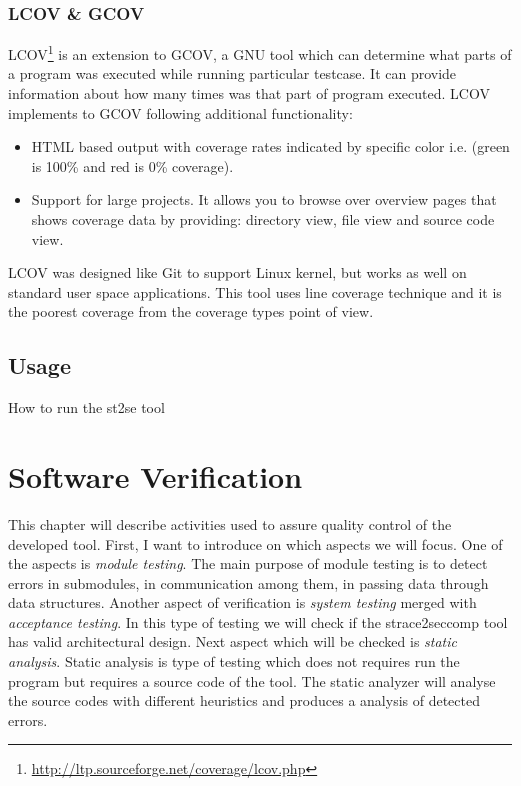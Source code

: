 \subsection{LCOV \& GCOV}
LCOV\footnote{\url{http://ltp.sourceforge.net/coverage/lcov.php}} is an extension to GCOV, a GNU tool which can determine what parts of a program was executed while running particular testcase.
It can provide information about how many times was that part of program executed.
LCOV implements to GCOV following additional functionality:
\begin{itemize}
	\item HTML based output with coverage rates indicated by specific color i.e. (green is 100\% and red is 0\% coverage).
	\item Support for large projects. It allows you to browse over overview pages that shows coverage data
	by providing: directory view, file view and source code view.
\end{itemize}
LCOV was designed like Git to support Linux kernel, but works as well on standard user space applications.
This tool uses line coverage technique and it is the poorest coverage from the coverage types point of view.


\section{Usage}
How to run the st2se tool



\chapter{Software Verification}
This chapter will describe activities used to assure quality control of the developed tool.
First, I want to introduce on which aspects we will focus.
One of the aspects is \textit{module testing}.
The main purpose of module testing is to detect errors in submodules, in communication among them, in passing data through data structures.
Another aspect of verification is \textit{system testing} merged with \textit{acceptance testing}.
In this type of testing we will check if the strace2seccomp tool has valid architectural design.
Next aspect which will be checked is \textit{static analysis}.
Static analysis is type of testing which does not requires run the program but requires a source code of the tool.
The static analyzer will analyse the source codes with different heuristics and produces a analysis of detected errors. %


